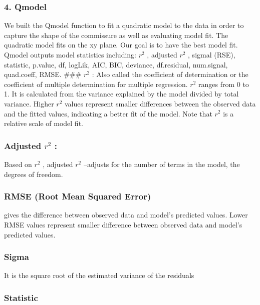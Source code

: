 \documentclass[10pt,letterpaper]{article}
\begin{document}
\hypertarget{qmodel}{%
\subsubsection{4. Qmodel}\label{qmodel}}

We built the Qmodel function to fit a quadratic model to the data in
order to capture the shape of the commissure as well as evaluating model
fit. The quadratic model fits on the xy plane. Our goal is to have the
best model fit. Qmodel outputs model statistics including: \(r^2\) ,
adjusted \(r^2\) , sigmal (RSE), statistic, p.value, df, logLik, AIC,
BIC, deviance, df.residual, num.signal, quad.coeff, RMSE. \#\#\# \(r^2\)
: Also called the coefficient of determination or the coefficient of
multiple determination for multiple regression. \(r^2\) ranges from 0 to
1. It is calculated from the variance explained by the model divided by
total variance. Higher \(r^2\) values represent smaller differences
between the observed data and the fitted values, indicating a better fit
of the model. Note that \(r^2\) is a relative scale of model fit.

\hypertarget{adjusted-r2}{%
\subsubsection{\texorpdfstring{Adjusted \(r^2\)
:}{Adjusted r\^{}2 :}}\label{adjusted-r2}}

Based on \(r^2\) , adjusted \(r^2\) --adjusts for the number of terms in
the model, the degrees of freedom.

\hypertarget{rmse-root-mean-squared-error}{%
\subsubsection{RMSE (Root Mean Squared
Error)}\label{rmse-root-mean-squared-error}}

gives the difference between observed data and model's predicted values.
Lower RMSE values represent smaller difference between observed data and
model's predicted values.

\hypertarget{sigma}{%
\subsubsection{Sigma}\label{sigma}}

It is the square root of the estimated variance of the residuals

\hypertarget{statistic}{%
\subsubsection{Statistic}\label{statistic}}
\end{document}
